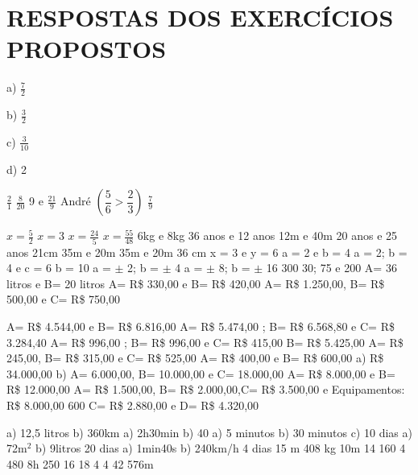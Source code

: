 \section{RESPOSTAS DOS EXERCÍCIOS PROPOSTOS}

\begin{respostas}{2}
	\ansitem{}
	\begin{multicols}{4}
		a) $\frac{7}{2}$

		b) $\frac{3}{2}$

		c) $\frac{3}{10}$
		
		d) 2
	\end{multicols}
	\ansitem{} $\frac{2}{1}$
	\ansitem{} $\frac{8}{20}$
	\ansitem{} 9 e $\frac{21}{9}$
	\ansitem{} André $\left(\dfrac{5}{6} > \dfrac{2}{3}\right)$
	\ansitem{} $\frac{7}{9}$
\end{respostas}

\begin{respostas}{3}

	\ansitem{} $x = \frac{5}{2}$
	\ansitem{} $x = 3$		
	\ansitem{} $x = \frac{24}{5}$	
	\ansitem{} $x = \frac{55}{48}$
	\ansitem{} 6kg e 8kg
	\ansitem{} 36 anos e 12 anos
	\ansitem{} 12m e 40m
    \ansitem{} 20 anos e 25 anos
    \ansitem{} 21cm
    \ansitem{} 35m e 20m
    \ansitem{} 35m e 20m
    \ansitem{} 36 cm
    \ansitem{} x = 3  e y = 6
    \ansitem{} a = 2  e b = 4
    \ansitem{} a = 2;  b = 4  e  c = 6
    \ansitem{} b = 10
    \ansitem{} a = $\pm$ 2; b = $\pm$ 4 
    \ansitem{} a = $\pm$ 8; b = $\pm$ 16
    \ansitem{} 300
    \ansitem{} 30; 75 e 200
	\ansitem{} A= 36 litros e B= 20 litros
	\ansitem{} A= R\$ 330,00 e B= R\$ 420,00      
	\ansitem{} A= R\$ 1.250,00, B= R\$ 500,00 e C= R\$ 750,00
\end{respostas}

\begin{respostas}{4}
\ansitem{} A= R\$ 4.544,00  e B= R\$ 6.816,00
\ansitem{} A= R\$ 5.474,00 ;  B= R\$ 6.568,80 e C= R\$ 3.284,40
\ansitem{} A= R\$ 996,00 ;  B= R\$ 996,00 e C= R\$ 415,00
\ansitem{} B= R\$ 5.425,00
\ansitem{} A= R\$ 245,00, B= R\$ 315,00 e C= R\$ 525,00
\ansitem{} A= R\$ 400,00 e B= R\$ 600,00
\ansitem{}  
a) R\$ 34.000,00
b) A= 6.000,00, B= 10.000,00 e C= 18.000,00 
\ansitem{} A= R\$  8.000,00 e B= R\$ 12.000,00
\ansitem{} A= R\$ 1.500,00, B= R\$ 2.000,00,C= R\$ 3.500,00 e Equipamentos: R\$ 8.000,00
\ansitem{} 600		
\ansitem{} C= R\$ 2.880,00 e D= R\$ 4.320,00
\end{respostas}

\begin{respostas}{5}
	\ansitem{} a) 12,5 litros \quad \quad b) 360km
	\ansitem{} a) 2h30min \quad \quad b) 40
	\ansitem{} a) 5 minutos \quad \quad b) 30 minutos \quad \quad c) 10 dias
	\ansitem{} a) 72m$^2$ \quad \quad b) 9litros
	\ansitem{} 20 dias
	\ansitem{} a) 1min40s \quad \quad b) 240km/h
	\ansitem{} 4 dias
	\ansitem{} 15 m
	\ansitem{} 408 kg
	\ansitem{} 10m
	\ansitem{} 14
	\ansitem{} 160
	\ansitem{} 4
	\ansitem{} 480
	\ansitem{} 8h
	\ansitem{} 250
	\ansitem{} 16
	\ansitem{} 18
	\ansitem{} 4
	\ansitem{} 4
	\ansitem{} 42
	\ansitem{} 576m
\end{respostas}

